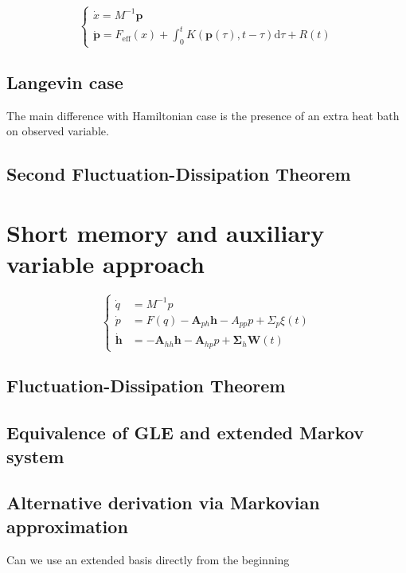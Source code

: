 \documentclass{article}
\numberwithin{equation}{section} %
\newcommand{\1}{\mathds{1}} %
\newcommand{\dd}{\mathrm{d}} %
\begin{document}
\begin{equation}
    \label{eq:GLE_Hamilton}
    \begin{cases}
    \dot{x}= M^{-1} \bm{p} \\
    \dot{\bm{p}} = F_\text{eff}(x) + \int_0^t K(\bm{p}(\tau),t-\tau)  \dd \tau +R(t)
    \end{cases}
\end{equation}
\subsection{Langevin case}



The main difference with Hamiltonian case is the presence of an extra heat bath on observed variable.

\subsection{Second Fluctuation-Dissipation Theorem}

\section{Short memory and auxiliary variable approach}
\begin{equation}
    \label{eq:aux_var_sys}
    \begin{cases}
    \dot q &= M^{-1} p \\
    \dot p &= F(q) - \bm{A}_{ph} \bm{h}  -A_{pp} p + \Sigma_p \xi(t)  \\
   \dot{\bm{h}} &= -\bm{A}_{hh} \bm{h} - \bm{A}_{hp} p + \bm{\Sigma}_h \bm{W}(t)
\end{cases}
\end{equation}

\subsection{Fluctuation-Dissipation Theorem}

\subsection{Equivalence of GLE and extended Markov system}


\subsection{Alternative derivation via Markovian approximation}
Can we use an extended basis directly from the beginning
\end{document}

